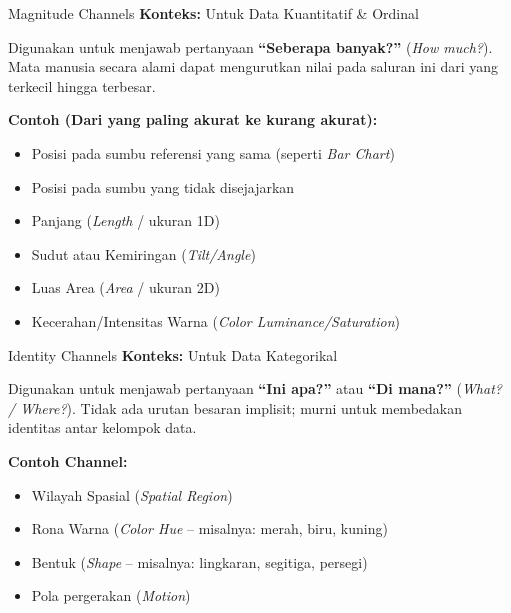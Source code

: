 \documentclass[t]{beamer}
\begin{document}
\begin{frame}{Magnitude Channels}
    \textbf{Konteks:} Untuk Data Kuantitatif \& Ordinal
    \vspace{0.2cm}
    
    Digunakan untuk menjawab pertanyaan \textbf{``Seberapa banyak?''} (\textit{How much?}). Mata manusia secara alami dapat mengurutkan nilai pada saluran ini dari yang terkecil hingga terbesar.
    \vspace{0.3cm}

    \textbf{Contoh (Dari yang paling akurat ke kurang akurat):}
    \begin{itemize}
        \item Posisi pada sumbu referensi yang sama (seperti \textit{Bar Chart})
        \item Posisi pada sumbu yang tidak disejajarkan
        \item Panjang (\textit{Length} / ukuran 1D)
        \item Sudut atau Kemiringan (\textit{Tilt/Angle})
        \item Luas Area (\textit{Area} / ukuran 2D)
        \item Kecerahan/Intensitas Warna (\textit{Color Luminance/Saturation})
    \end{itemize}
\end{frame}

\begin{frame}{Identity Channels}
    \textbf{Konteks:} Untuk Data Kategorikal
    \vspace{0.2cm}

    Digunakan untuk menjawab pertanyaan \textbf{``Ini apa?''} atau \textbf{``Di mana?''} (\textit{What? / Where?}). Tidak ada urutan besaran implisit; murni untuk membedakan identitas antar kelompok data.
    \vspace{0.3cm}

    \textbf{Contoh Channel:}
    \begin{itemize}
        \item Wilayah Spasial (\textit{Spatial Region})
        \item Rona Warna (\textit{Color Hue} -- misalnya: merah, biru, kuning)
        \item Bentuk (\textit{Shape} -- misalnya: lingkaran, segitiga, persegi)
        \item Pola pergerakan (\textit{Motion})
    \end{itemize}
\end{frame}
\end{document}
